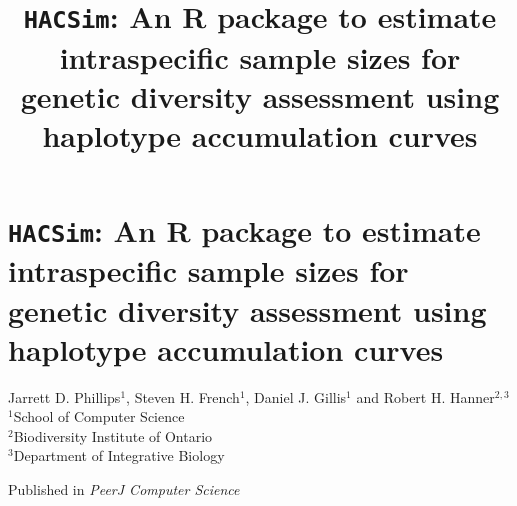 \linespread{1.0}

\chapter{{\tt HACSim}: An R package to estimate intraspecific sample sizes for genetic diversity assessment using haplotype accumulation curves\\}

\title{\textbf{{\tt HACSim}: An R package to estimate intraspecific sample sizes for genetic diversity assessment using haplotype accumulation curves}}

\noindent Jarrett D. Phillips$^{1}$, Steven H. French$^{1}$, Daniel J. Gillis$^1$ and Robert H. Hanner$^{2, 3}$ \\ $^1$School of Computer Science \\ $^2$Biodiversity Institute of Ontario \\ $^3$Department of Integrative Biology

\vspace{\fill}

\noindent Published in \textit{PeerJ Computer Science}

